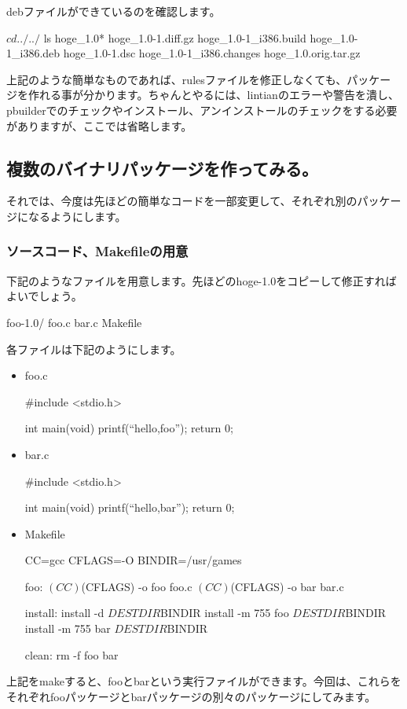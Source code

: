 \documentclass[mingoth,a4paper]{jsarticle}
\begin{document}
debファイルができているのを確認します。
\begin{commandline}
$ cd ../../
$ ls hoge_1.0*
hoge_1.0-1.diff.gz  hoge_1.0-1_i386.build    hoge_1.0-1_i386.deb
hoge_1.0-1.dsc      hoge_1.0-1_i386.changes  hoge_1.0.orig.tar.gz
\end{commandline}

上記のような簡単なものであれば、rulesファイルを修正しなくても、パッケー
ジを作れる事が分かります。ちゃんとやるには、lintianのエラーや警告を潰し、
pbuilderでのチェックやインストール、アンインストールのチェックをする必要
がありますが、ここでは省略します。

\subsection{複数のバイナリパッケージを作ってみる。}
それでは、今度は先ほどの簡単なコードを一部変更して、それぞれ別のパッケー
ジになるようにします。

\subsubsection{ソースコード、Makefileの用意}
下記のようなファイルを用意します。先ほどのhoge-1.0をコピーして修正すれば
よいでしょう。

\begin{commandline}
foo-1.0/
 foo.c
 bar.c
 Makefile
\end{commandline}
各ファイルは下記のようにします。
\begin{itemize}
 \item
      foo.c
      \begin{commandline}
#include <stdio.h>

int main(void)
{
  printf(``hello,foo\n'');
  return 0;
}
      \end{commandline}
 \item
      bar.c
      \begin{commandline}
#include <stdio.h>

int main(void)
{
  printf(``hello,bar\n'');
  return 0;
}
      \end{commandline}
 \item
      Makefile
      \begin{commandline}
CC=gcc
CFLAGS=-O
BINDIR=/usr/games

foo:
       $(CC) $(CFLAGS) -o foo foo.c
       $(CC) $(CFLAGS) -o bar bar.c

install:
       install -d ${DESTDIR}${BINDIR}
       install -m 755 foo ${DESTDIR}${BINDIR}
       install -m 755 bar ${DESTDIR}${BINDIR}

clean:
       rm -f foo bar
      \end{commandline}
\end{itemize}
上記をmakeすると、fooとbarという実行ファイルができます。今回は、これらを
それぞれfooパッケージとbarパッケージの別々のパッケージにしてみます。
\end{document}
